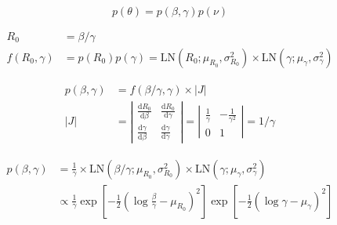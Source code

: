 \documentclass{article}
\begin{document}
 \\

\[p(\theta) = p(\beta,\gamma)p(\nu)\]

\begin{align*}
R_0 &= \beta / \gamma \\
f(R_0,\gamma) &= p(R_0)p(\gamma) = \mbox{LN}(R_0;\mu_{R_0},\sigma^2_{R_0})\times\mbox{LN}(\gamma;\mu_{\gamma},\sigma^2_{\gamma})
\end{align*}

\begin{align*}
p(\beta,\gamma) &= f(\beta / \gamma, \gamma)\times|J| \\
|J| &= \left|\begin{array}{cc}
\frac{\mbox{d}R_0}{\mbox{d}\beta} & \frac{\mbox{d}R_0}{\mbox{d}\gamma} \\
\frac{\mbox{d}\gamma}{\mbox{d}\beta} & \frac{\mbox{d}\gamma}{\mbox{d}\gamma}
\end{array}
\right| = \left|\begin{array}{cc}
\frac{1}{\gamma} & -\frac{1}{\gamma^2} \\
0 & 1
\end{array}
\right| = 1 / \gamma
\end{align*}

\begin{align*}
p(\beta,\gamma) &= \frac{1}{\gamma}\times\mbox{LN}(\beta/\gamma;\mu_{R_0},\sigma^2_{R_0})\times\mbox{LN}(\gamma;\mu_{\gamma},\sigma^2_{\gamma}) \\
 &\propto \frac{1}{\gamma}\exp[-\frac{1}{2}(\log\frac{\beta}{\gamma} - \mu_{R_0})^2]\exp[-\frac{1}{2}(\log\gamma - \mu_{\gamma})^2]
\end{align*}
\end{document}

